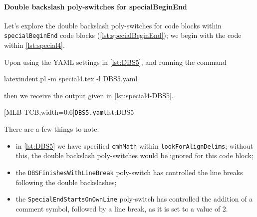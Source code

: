 \documentclass[10pt]{article}
\begin{document}
 \paragraph{Double backslash poly-switches for specialBeginEnd}
  \begin{example}
  Let's explore the double backslash poly-switches for code blocks within
  \texttt{specialBeginEnd} code blocks (\vref{lst:specialBeginEnd}); we begin with the
  code within \cref{lst:special4}.     


  Upon using the YAML settings in \cref{lst:DBS5}, and running the command
   

  \begin{commandshell}
latexindent.pl -m special4.tex -l DBS5.yaml
\end{commandshell}

  then we receive the output given in \cref{lst:special4-DBS5}. 

  \begin{cmhtcbraster}[
    raster force size=false,
    raster column 1/.style={add to width=-.1\textwidth},
    raster column skip=.06\linewidth]
   [MLB-TCB,width=0.6\textwidth]{\texttt{DBS5.yaml}}{lst:DBS5}
  \end{cmhtcbraster}

  There are a few things to note:
  \begin{itemize}
   \item in \cref{lst:DBS5} we have specified \texttt{cmhMath} within
         \texttt{lookForAlignDelims}; without this, the double backslash poly-switches
         would be ignored for this code block;
   \item the \texttt{DBSFinishesWithLineBreak} poly-switch has controlled the line breaks
         following the double backslashes;
   \item the \texttt{SpecialEndStartsOnOwnLine} poly-switch has controlled the addition
         of a comment symbol, followed by a line break, as it is set to a value of 2.
  \end{itemize}
  \end{example}
\end{document}
